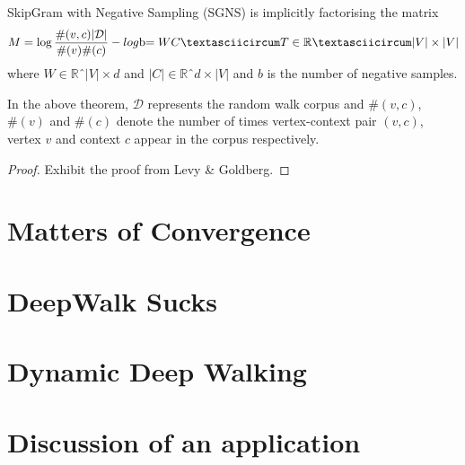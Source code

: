 \documentclass[a4paper]{article}
\begin{document}
\begin{theorem}
SkipGram with Negative Sampling (SGNS) is implicitly factorising the matrix
\[M = \log{\frac{\#(v,c)|\mathcal{D}|}{\#(v)\#(c)}} - log$b$ = WCˆT\in \mathbb{R}ˆ{|V|
    \times |V|}\]
where $W \in \mathbb{R}ˆ{|V| \times d}$ and $|C| \in \mathbb{R}ˆ{d \times |V|}$
and $b$ is the number of negative samples.
\end{theorem}

In the above theorem, $\mathcal{D}$ represents the random walk corpus and
$\#(v,c)$, $\#(v)$ and $\#(c)$ denote the number of times vertex-context pair
$(v,c)$, vertex $v$ and context $c$ appear in the corpus respectively.

\begin{proof}
  Exhibit the proof from Levy & Goldberg.
\end{proof}

\section{Matters of Convergence}
\section{DeepWalk Sucks}
\section{Dynamic Deep Walking}
\section{Discussion of an application}
\end{document}
